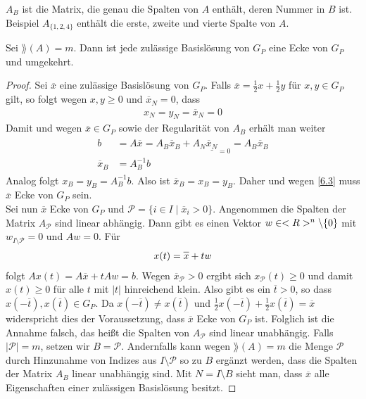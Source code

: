 \begin{*anmerkung}
$A_B$ ist die Matrix, die genau die Spalten von $A$ enthält, deren Nummer in $B$ ist. Beispiel $A_{\{1,2,4\}}$ enthält die erste, zweite und vierte Spalte von $A$.
\end{*anmerkung}

\begin{proposition}[Eckencharakterisierungssatz]
	Sei $\rang(A)=m$. Dann ist jede zulässige Basislösung von $G_P$ eine Ecke von $G_P$ und umgekehrt.
\end{proposition}
\begin{proof}
	Sei $\overline{x}$ eine zulässige Basislösung von $G_P$. Falls $\overline{x}=\frac{1}{2}x+\frac{1}{2}y$ für $x,y\in G_P$ gilt, so folgt wegen $x,y\ge 0$ und $\overline{x}_N=0$, dass
	\begin{align}
		\label{6.3}
		x_N=y_N=\overline{x}_N=0
	\end{align}
	Damit und wegen $\overline{x}\in G_P$ sowie der Regularität von $A_B$ erhält man weiter
	\begin{align}
		\label{6.4}
		\begin{split}
			b &= A\overline{x} = A_B\overline{x}_B + A_N\underline{\overline{x}_N}_{=0} = A_B\overline{x}_B \\
			\overline{x}_B &= A^{-1}_Bb
		\end{split}
	\end{align}
	Analog folgt $x_B=y_B=A^{-1}_Bb$. Also ist $\overline{x}_B=x_B=y_B$. Daher und wegen \cref{6.3} muss $\overline{x}$ Ecke von $G_P$ sein. \\
	Sei nun $\overline{x}$ Ecke von $G_P$ und $\mathcal{P}=\{i\in I\mid \overline{x}_i>0\}$. Angenommen die Spalten der Matrix $A_\mathcal{P}$ sind linear abhängig. Dann gibt es einen Vektor $w\in<R>^n\backslash\{0\}$ mit $w_{I\setminus\mathcal{P}}=0$ und $Aw=0$. Für
	\begin{align}
		x(t) = \overline{x} + tw\notag
	\end{align}
	folgt $Ax(t)=A\overline{x} + tAw=b$. Wegen $\overline{x}_\mathcal{P}>0$ ergibt sich $x_\mathcal{P}(t)\ge 0$ und damit $x(t)\ge 0$ für alle $t$ mit $\vert t\vert$ hinreichend klein. Also gibt es ein $\overline{t}>0$, so dass $x(-\overline{t}),x(\overline{t})\in G_P$. Da $x(-\overline{t})\neq x(\overline{t})$ und $\frac{1}{2}x(-\overline{t}) + \frac{1}{2}x(\overline{t})=\overline{x}$ widerspricht dies der Voraussetzung, dass $\overline{x}$ Ecke von $G_P$ ist. Folglich ist die Annahme falsch, das heißt die Spalten von $A_\mathcal{P}$ sind linear unabhängig. Falls $\vert \mathcal{P}\vert=m$, setzen wir $B=\mathcal{P}$. Andernfalls kann wegen $\rang(A)=m$ die Menge $\mathcal{P}$ durch Hinzunahme von Indizes aus $I\setminus \mathcal{P}$ so zu $B$ ergänzt werden, dass die Spalten der Matrix $A_B$ linear unabhängig sind. Mit $N=I\setminus B$ sieht man, dass $\overline{x}$ alle Eigenschaften einer zulässigen Basislösung besitzt.
\end{proof}

